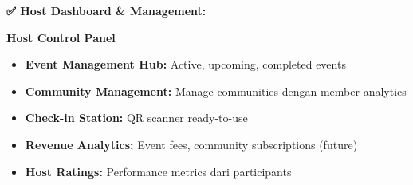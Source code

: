 \documentclass[12pt,a4paper]{article}
\begin{document}
\begin{implemented}
\textbf{✅ Host Dashboard \& Management:}

\textbf{Host Control Panel}
\begin{itemize}
    \item \textbf{Event Management Hub:} Active, upcoming, completed events
    \item \textbf{Community Management:} Manage communities dengan member analytics
    \item \textbf{Check-in Station:} QR scanner ready-to-use
    \item \textbf{Revenue Analytics:} Event fees, community subscriptions (future)
    \item \textbf{Host Ratings:} Performance metrics dari participants
\end{itemize}


\end{implemented}
\end{document}
